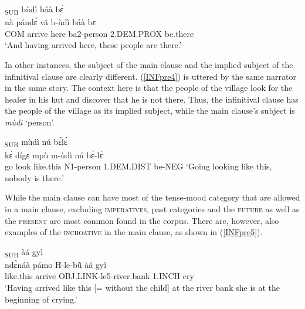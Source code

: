 \begin{exe} 
\ex\label{INFpre3}
  \glll   [nà pándɛ̀ vâ]\textsubscript{SUB} bùdì báà bɛ̀ \\
          nà pándɛ̀ vâ b-ùdì báà bɛ \\
      COM arrive here ba2-person 2.DEM.PROX be.there   \\
    \trans `And having arrived here, these people are there.'
\end{exe}





In other instances, the subject of the main clause and the implied subject of the infinitival clause are clearly different. (\ref{INFpre4}) is uttered by the same narrator in the same story. The context here is that the people of the village look for the healer in his hut and discover that he is not there. Thus, the infinitival clause has the people of the village as its implied subject, while the main clause's subject is {\itshape mùdì} `person'.

\begin{exe} 
\ex\label{INFpre4}
  \gll  [kɛ̀ dígɛ̀ mpù]\textsubscript{SUB} mùdì nú bɛ́lɛ́  \\
          kɛ̀ dígɛ mpù m-ùdì nú bɛ́-lɛ́ \\
          go look like.this N1-person 1.DEM.DIST be-NEG
    \trans `Going looking like this, nobody is there.'
\end{exe}


While the main clause can have most of the tense-mood category that are allowed in a main clause, excluding \textsc{imperatives}, past categories and the \textsc{future} as well as the \textsc{present} are most common found in the corpus. There are, however, also examples of the \textsc{inchoative} in the main clause, as shown in (\ref{INFpre5}).

\begin{exe} 
\ex\label{INFpre5}
  \glll  [ndɛ̀náà pámò lébũ̂]\textsubscript{SUB} àá gyì \\
         ndɛ̀náà pámo H-le-bũ̂ àá gyì \\
        like.this arrive OBJ.LINK-le5-river.bank 1.INCH cry \\
    \trans `Having arrived like this [= without the child] at the river bank she is at the beginning of crying.'
\end{exe}

